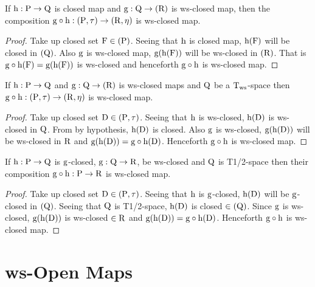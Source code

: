 \begin{thm}\label{thm4.2.34}
If $\mathrm{h}: \mathrm{P} \to \mathrm{Q}$ is closed map and $\mathrm{g}: \mathrm{Q}\to (\mathrm{R})$ is ws-closed map, then the composition $\mathrm{g} \circ \mathrm{h}: (\mathrm{P}, \tau) \to (\mathrm{R}, \eta)$ is ws-closed map.
\end{thm}

\begin{proof}
Take up closed set $\mathrm{F} \in(\mathrm{P})$. Seeing that $\mathrm{h}$ is closed map, $\mathrm{h} (\mathrm{F})$ will be closed in $(\mathrm{Q})$. Also $\mathrm{g}$ is ws-closed map, $\mathrm{g} (\mathrm{h}(\mathrm{F}))$ will be ws-closed in $(\mathrm{R})$. That is $\mathrm{g} \circ \mathrm{h} (\mathrm{F}) = \mathrm{g} (\mathrm{h} (\mathrm{F}))$ is ws-closed and henceforth $\mathrm{g} \circ \mathrm{h}$ is ws-closed map.
\end{proof}

\begin{thm}\label{thm4.2.35}
If $\mathrm{h}: \mathrm{P} \to \mathrm{Q}$ and $\mathrm{g}: \mathrm{Q}\to (\mathrm{R})$ is ws-closed maps and $\mathrm{Q}$ be a $\mathrm{T}_{\text{ws}}$-space then $\mathrm{g} \circ \mathrm{h}: (\mathrm{P}, \tau) \to (\mathrm{R}, \eta)$ is ws-closed map.
\end{thm}

\begin{proof}
Take up closed set $\mathrm{D} \in (\mathrm{P}, \tau)$. Seeing that $\mathrm{h}$ is ws-closed, $\mathrm{h} (\mathrm{D})$ is ws-closed in $\mathrm{Q}$. From by hypothesis, $\mathrm{h} (\mathrm{D})$ is closed. Also $\mathrm{g}$ is ws-closed, $\mathrm{g} (\mathrm{h} (\mathrm{D}))$ will be ws-closed in $\mathrm{R}$ and $\mathrm{g}(\mathrm{h}(\mathrm{D})) = \mathrm{g} \circ \mathrm{h}(\mathrm{D})$. Henceforth $\mathrm{g} \circ \mathrm{h}$ is ws-closed map.
\end{proof}

\begin{thm}\label{thm4.2.36}
If $\mathrm{h}: \mathrm{P} \to \mathrm{Q}$ is $\mathrm{g}$-closed, $\mathrm{g}: \mathrm{Q} \to \mathrm{R}$, be ws-closed and $\mathrm{Q}$ is T1/2-space then their composition $\mathrm{g} \circ \mathrm{h}: \mathrm{P} \to \mathrm{R}$ is ws-closed map.
\end{thm}

\begin{proof}
Take up closed set $\mathrm{D} \in (\mathrm{P}, \tau)$. Seeing that $\mathrm{h}$ is $\mathrm{g}$-closed, $\mathrm{h} (\mathrm{D})$ will be $\mathrm{g}$-closed in $(\mathrm{Q})$. Seeing that $\mathrm{Q}$ is T1/2-space, $\mathrm{h}(\mathrm{D})$ is closed $\in (\mathrm{Q})$. Since $\mathrm{g}$ is ws-closed, $\mathrm{g} (\mathrm{h}(\mathrm{D}))$ is ws-closed $\in \mathrm{R}$ and $\mathrm{g}(\mathrm{h}(\mathrm{D})) = \mathrm{g} \circ \mathrm{h}(\mathrm{D})$. Henceforth $\mathrm{g} \circ \mathrm{h}$ is ws-closed map.
\end{proof}

\section{ws-Open Maps}

